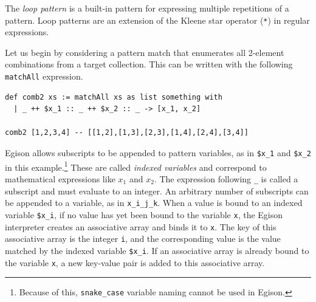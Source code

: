 The \emph{loop pattern} is a built-in pattern for expressing multiple repetitions of a pattern.
Loop patterns are an extension of the Kleene star operator (\lstinline{*}) in regular expressions.

Let us begin by considering a pattern match that enumerates all 2-element combinations from a target collection.
This can be written with the following \lstinline{matchAll} expression.
\begin{lstlisting}[language=egison,numbers=none]
def comb2 xs := matchAll xs as list something with
  | _ ++ $x_1 :: _ ++ $x_2 :: _ -> [x_1, x_2]

comb2 [1,2,3,4] -- [[1,2],[1,3],[2,3],[1,4],[2,4],[3,4]]
\end{lstlisting}
Egison allows subscripts to be appended to pattern variables, as in \lstinline|$x_1| and \lstinline|$x_2| in this example.\footnote{Because of this, \texttt{snake\_case} variable naming cannot be used in Egison.}
These are called \emph{indexed variables} and correspond to mathematical expressions like $x_1$ and $x_2$.
The expression following \lstinline|_| is called a subscript and must evaluate to an integer.
An arbitrary number of subscripts can be appended to a variable, as in \lstinline|x_i_j_k|.
When a value is bound to an indexed variable \lstinline|$x_i|, if no value has yet been bound to the variable \lstinline|x|, the Egison interpreter creates an associative array and binds it to \lstinline|x|.
The key of this associative array is the integer \lstinline|i|, and the corresponding value is the value matched by the indexed variable \lstinline|$x_i|.
If an associative array is already bound to the variable \lstinline|x|, a new key-value pair is added to this associative array.

